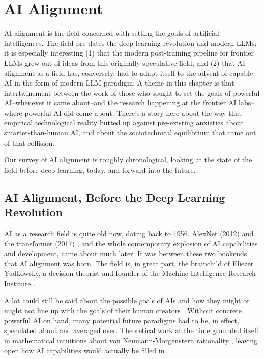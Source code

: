 \chapter{AI Alignment}\label{ch_ai_alignment}

AI alignment is the field concerned with setting the goals of artificial
intelligences. The field pre-dates the deep learning revolution and modern
LLMs; it is especially interesting (1) that the modern post-training pipeline
for frontier LLMs grew out of ideas from this originally speculative field, and
(2) that AI alignment as a field has, conversely, had to adapt itself to the
advent of capable AI in the form of modern LLM paradigm. A theme in this
chapter is that intertwinement between the work of those who sought to set the
goals of powerful AI--whenever it came about--and the research happening at the
frontier AI labs--where powerful AI did come about. There's a story here about
the way that empirical technological reality butted up against pre-existing
anxieties about smarter-than-human AI, and about the sociotechnical equilibrium
that came out of that collision.

Our survey of AI alignment is roughly chronological, looking at the state of
the field before deep learning, today, and forward into the future.

\section{AI Alignment, Before the Deep Learning Revolution}
AI as a research field is quite old now, dating back to 1956. AlexNet (2012)
\cite{krizhevsky2012imagenet} and the transformer (2017)
\cite{vaswani2017attention}, and the whole contemporary explosion of AI
capabilities and development, came about much later. It was between these two
bookends that AI alignment was born. The field is, in great part, the
brainchild of Eliezer Yudkowsky, a decision theorist and founder of the Machine
Intelligence Research Institute \cite{yudkowsky2008factor}.

A lot could still be said about the possible goals of AIs and how they might or
might not line up with the goals of their human creators
\cite{bostrom2014superintelligence,omohundro2008drives,yudkowsky2008factor}.
Without concrete powerful AI on hand, many potential future paradigms had to
be, in effect, speculated about and averaged over. Theoretical work at the time
grounded itself in mathematical intuitions about von Neumann-Morgenstern
rationality \cite{von1944games}, leaving open how AI capabilities would
actually be filled in \cite{soares2015corrigibility}.


